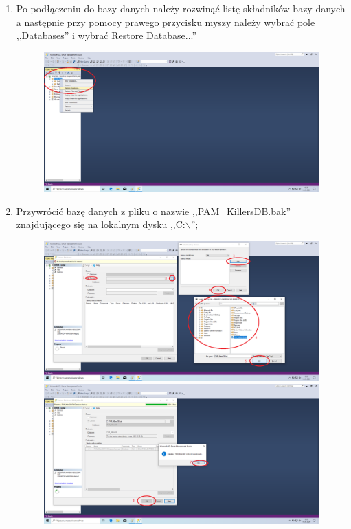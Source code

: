 \documentclass[12pt,a4paper]{article}
\begin{document}
\begin{enumerate}
				\item Po podłączeniu do bazy danych należy rozwinąć listę składników bazy danych a następnie przy pomocy prawego przycisku myszy należy wybrać pole ,,Databases'' i wybrać
					Restore Database...''\\
					\begin{figure}[H]
						\centering
						\includegraphics[scale=0.3]{img/Local_Install_10.png}
					\end{figure}
									 					
				\item Przywrócić bazę danych z pliku o nazwie ,,PAM\_KillersDB.bak'' znajdującego się na lokalnym dysku ,,C:$\backslash$'';
					\begin{figure}[H]
						\centering
						\includegraphics[scale=0.3]{img/Local_Install_11.png}\\
						\includegraphics[scale=0.3]{img/Local_Install_12.png}
					\end{figure}
									

\end{enumerate}
\end{document}
